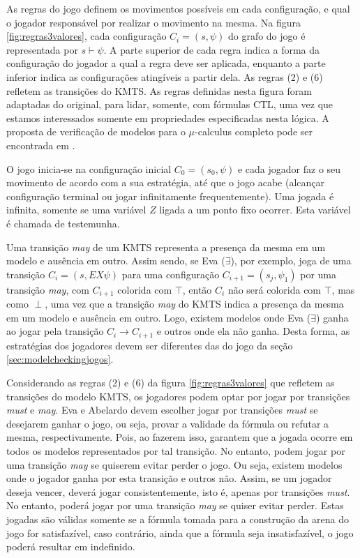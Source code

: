 \documentclass[normaltoc,capchap,capsec,times]{abnt}
\begin{document}
As regras do jogo definem os movimentos possíveis em cada configuração, e qual o jogador responsável por realizar o movimento na mesma. Na figura \ref{fig:regras3valores}, cada configuração $C_i=(s,\psi)$ do grafo do jogo é representada por $s \vdash \psi$. A parte superior de cada regra indica a forma da configuração do jogador a qual a regra deve ser aplicada, enquanto a parte inferior indica as configurações atingíveis a partir dela. As regras (2) e (6) refletem as transições do KMTS. As regras definidas nesta figura foram adaptadas do original, para lidar, somente, com fórmulas CTL, uma vez que estamos interessados somente em propriedades especificadas nesta lógica. A proposta de verificação de modelos para o $\mu$-calculus completo pode ser encontrada em \cite{grumberglosing}.

O jogo inicia-se na configuração inicial $C_0=(s_0,\psi)$ e cada jogador faz o seu movimento de acordo com a sua estratégia, até que o jogo acabe (alcançar configuração terminal ou jogar infinitamente frequentemente). Uma jogada é infinita, somente se uma variável $Z$ ligada a um ponto fixo ocorrer. Esta variável é chamada de testemunha. 

Uma transição \textit{may} de um KMTS representa a presença da mesma em um modelo e ausência em outro. Assim sendo, se Eva ($\exists$), por exemplo, joga  de uma transição $C_i = (s,EX  \psi)$ para uma configuração $C_{i+1}=(s_j,\psi_1)$ por uma transição \textit{may}, com $C_{i+1}$ colorida com $\top$, então $C_i$ não será colorida com $\top$, mas como $\perp$, uma vez que a transição \textit{may} do KMTS indica a presença da mesma em um modelo e ausência em outro. Logo, existem modelos onde Eva ($\exists$) ganha ao jogar pela transição $C_i \to C_{i+1}$ e outros onde ela não ganha. Desta forma, as estratégias dos jogadores devem ser diferentes das do jogo da seção \ref{sec:modelcheckingjogos}.

Considerando as regras (2) e (6) da figura \ref{fig:regras3valores} que refletem as transições do modelo KMTS, os jogadores podem optar por jogar por transições \textit{must} e \textit{may}. Eva e Abelardo devem escolher jogar por transições \textit{must} se desejarem ganhar o jogo, ou seja, provar a validade da fórmula ou refutar a mesma, respectivamente. Pois, ao fazerem isso, garantem que a jogada ocorre em todos os modelos representados por tal transição. No entanto, podem jogar por uma transição \textit{may} se quiserem evitar perder o jogo. Ou seja, existem modelos onde o jogador ganha por esta transição e outros não. Assim, se um jogador deseja vencer, deverá jogar consistentemente, isto é, apenas por transições \textit{must}. No entanto, poderá jogar por uma transição \textit{may} se quiser evitar perder. Estas jogadas são válidas somente se a fórmula tomada para a construção da arena do jogo for satisfazível, caso contrário, ainda que a fórmula seja insatisfazível, o jogo poderá resultar em indefinido.
\end{document}
